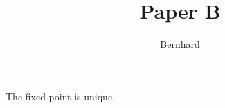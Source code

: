 \title{Paper B}\author{Bernhard}
\begin{theorem}\label{thm:main}
The fixed point is unique.
\end{theorem}
\cite{paper-c}

